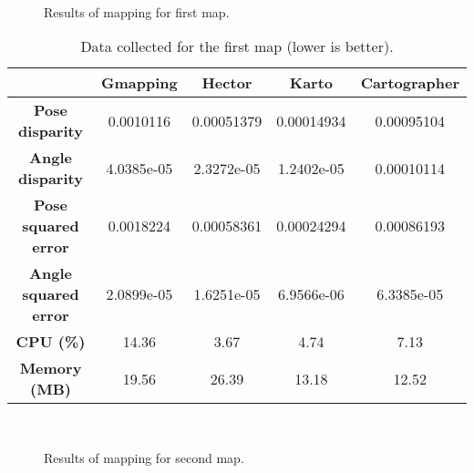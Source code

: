 \newpage
\begin{figure}[!ht]
     \centering
     \hspace{1cm}
     \\
     \hspace{1cm}
     \caption{Results of mapping for first map.}
     \label{fig:results1}
\end{figure}

\begin{table}[!ht]
\centering
\renewcommand*{\arraystretch}{1.1}
\begin{tabular}{c|c|c|c|c}
& \textbf{Gmapping} & \textbf{Hector} & \textbf{Karto} & \textbf{Cartographer} \\ \hline
\textbf{Pose disparity} & 0.0010116 & 0.00051379 & 0.00014934 & 0.00095104 \\
\textbf{Angle disparity} & 4.0385e-05 & 2.3272e-05 & 1.2402e-05 & 0.00010114 \\
\textbf{Pose squared error} & 0.0018224 & 0.00058361 & 0.00024294 & 0.00086193 \\
\textbf{Angle squared error} & 2.0899e-05 & 1.6251e-05 & 6.9566e-06 & 6.3385e-05 \\
\textbf{CPU (\%)} & 14.36 & 3.67 & 4.74 & 7.13 \\
\textbf{Memory (MB)} & 19.56 & 26.39 & 13.18 & 12.52 \\ \hline
\end{tabular}
\caption{Data collected for the first map (lower is better).}
\label{tab:results1}
\end{table}


\begin{figure}[!ht]
     \centering
     \hspace{1cm}
     \\
     \hspace{1cm}
     \caption{Results of mapping for second map.}
     \label{fig:results2}
\end{figure}

